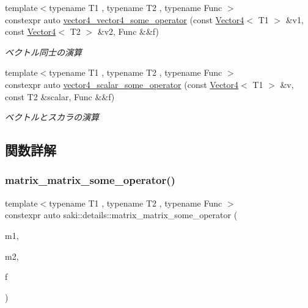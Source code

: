 \begin{DoxyCompactItemize}
{\footnotesize template$<$typename T1 , typename T2 , typename Func $>$ }\\constexpr auto \mbox{\hyperlink{namespacesaki_1_1details_a7faa5e95c73949e48acc6840c357990f}{vector4\+\_\+vector4\+\_\+some\+\_\+operator}} (const \mbox{\hyperlink{classsaki_1_1_vector4}{Vector4}}$<$ T1 $>$ \&v1, const \mbox{\hyperlink{classsaki_1_1_vector4}{Vector4}}$<$ T2 $>$ \&v2, Func \&\&f)
\begin{DoxyCompactList}\small\item\em ベクトル同士の演算 \end{DoxyCompactList}\item 
{\footnotesize template$<$typename T1 , typename T2 , typename Func $>$ }\\constexpr auto \mbox{\hyperlink{namespacesaki_1_1details_a1786beb40b0c29d0e6ea19ce2aad110c}{vector4\+\_\+scalar\+\_\+some\+\_\+operator}} (const \mbox{\hyperlink{classsaki_1_1_vector4}{Vector4}}$<$ T1 $>$ \&v, const T2 \&scalar, Func \&\&f)
\begin{DoxyCompactList}\small\item\em ベクトルとスカラの演算 \end{DoxyCompactList}\end{DoxyCompactItemize}


\subsection{関数詳解}
\mbox{\label{namespacesaki_1_1details_ab331ad2e5330aa422492d228d522aeea}} 
\subsubsection{\texorpdfstring{matrix\+\_\+matrix\+\_\+some\+\_\+operator()}{matrix\_matrix\_some\_operator()}}
{\footnotesize\ttfamily template$<$typename T1 , typename T2 , typename Func $>$ \\
constexpr auto saki\+::details\+::matrix\+\_\+matrix\+\_\+some\+\_\+operator (\begin{DoxyParamCaption}\item[{const \mbox{\hyperlink{classsaki_1_1_matrix}{Matrix}}$<$ T1 $>$ \&}]{m1,  }\item[{const \mbox{\hyperlink{classsaki_1_1_matrix}{Matrix}}$<$ T2 $>$ \&}]{m2,  }\item[{Func \&\&}]{f }\end{DoxyParamCaption})}



